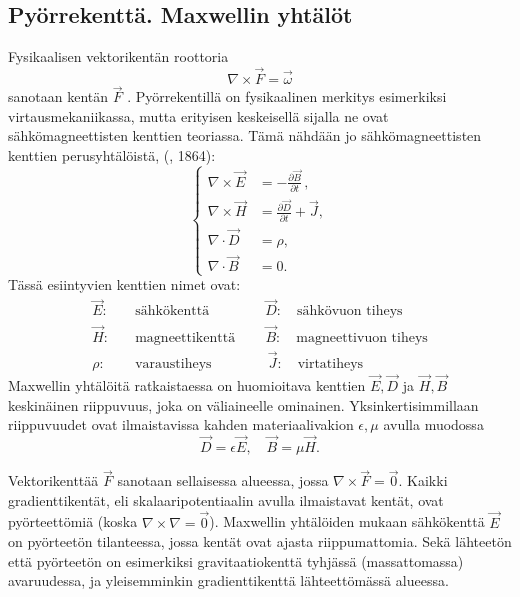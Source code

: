 \subsection*{Pyörrekenttä.  Maxwellin yhtälöt}

Fysikaalisen vektorikentän roottoria
\[
\nabla\times\vec F=\vec \omega
\]
%
sanotaan kentän $\vec F$ . Pyörrekentillä on fysikaalinen merkitys 
esimerkiksi virtausmekaniikassa, mutta erityisen keskeisellä sijalla ne ovat sähkömagneettisten
kenttien teoriassa. Tämä nähdään jo sähkömagneettisten kenttien perusyhtälöistä, 
 (, 1864): 
\[
\left\{\begin{aligned}
\nabla\times\vec E &= -\frac{\partial \vec B}{\partial t}\,, \\
\nabla\times\vec H &=  \frac{\partial \vec D}{\partial t}+\vec J, \\[2mm]
\nabla\cdot\vec D &=\rho, \\[3mm]
\nabla\cdot\vec B &= 0.
\end{aligned}\right.
\]
Tässä esiintyvien kenttien nimet ovat:
\begin{align*}
\vec E: \quad &\text{sähkökenttä} \qquad\qquad \vec D: \quad \text{sähkövuon tiheys} \\
\vec H: \quad &\text{magneettikenttä} \qquad\, \vec B: \quad \text{magneettivuon tiheys} \\
\rho  : \quad &\text{varaustiheys} \qquad\qquad \vec J: \quad \text{virtatiheys}
\end{align*}
Maxwellin yhtälöitä ratkaistaessa on huomioitava kenttien $\vec E,\vec D$ ja $\vec H,\vec B$
keskinäinen riippuvuus, joka on väliaineelle ominainen. Yksinkertisimmillaan riippuvuudet ovat
ilmaistavissa kahden materiaalivakion $\epsilon,\mu$ avulla muodossa 
\[
\vec D=\epsilon\vec E, \quad \vec B=\mu\vec H.
\]

Vektorikenttää $\vec F$ sanotaan  sellaisessa alueessa, jossa 
$\nabla\times\vec F=\vec 0$. Kaikki gradienttikentät, eli skalaaripotentiaalin avulla 
ilmaistavat kentät, ovat pyörteettömiä (koska $\nabla\times\nabla=\vec 0$). Maxwellin
yhtälöiden mukaan sähkökenttä $\vec E$ on pyörteetön  tilanteessa, jossa
kentät ovat ajasta riippumattomia. Sekä lähteetön että pyörteetön on esimerkiksi 
gravitaatiokenttä tyhjässä (massattomassa) avaruudessa, ja yleisemminkin gradienttikenttä 
lähteettömässä alueessa.

